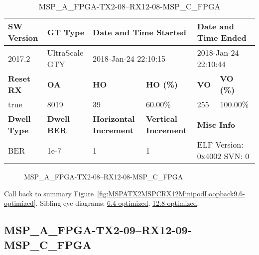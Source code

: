 \begin{table}[h]
\centering
\caption{MSP\_A\_FPGA-TX2-08--RX12-08-MSP\_C\_FPGA}
\label{tab:MSPAFPGATX208RX1208MSPCFPGA9.6-optimized}
\begin{tabular}{@{}|l|l|l|l|l|l|@{}}
\toprule
\textbf{SW Version}                & \textbf{GT Type}   & \multicolumn{2}{l|}{\textbf{Date and Time Started}}            & \multicolumn{2}{l|}{\textbf{Date and Time Ended}}        \\ \midrule
2017.2                       & UltraScale GTY          & \multicolumn{2}{l|}{2018-Jan-24 22:10:15}                   & \multicolumn{2}{l|}{2018-Jan-24 22:10:44}               \\ \midrule
\textbf{Reset RX}                  & \textbf{OA} & \textbf{HO}   & \textbf{HO (\%)} & \textbf{VO} & \textbf{VO (\%)} \\ \midrule
true & 8019        & 39          & 60.00\%        & 255        & 100.00\%       \\ \midrule
\textbf{Dwell Type}                & \textbf{Dwell BER} & \textbf{Horizontal Increment} & \textbf{Vertical Increment}    & \multicolumn{2}{l|}{\textbf{Misc Info}}                  \\ \midrule
BER                            & 1e-7        & 1        & 1           & \multicolumn{2}{l|}{ELF Version: 0x4002 SVN: 0}                         \\ \bottomrule
\end{tabular}
\end{table}

\begin{figure}[h]
\caption{MSP\_A\_FPGA-TX2-08--RX12-08-MSP\_C\_FPGA} \label{fig:MSPAFPGATX208RX1208MSPCFPGA9.6-optimized}
\end{figure}

Call back to summary Figure~\ref{fig:MSPATX2MSPCRX12MinipodLoopback9.6-optimized}.
Sibling eye diagrams: \hyperref[sec:MSPAFPGATX208RX1208MSPCFPGA6.4-optimized]{6.4-optimized}, \hyperref[sec:MSPAFPGATX208RX1208MSPCFPGA12.8-optimized]{12.8-optimized}.

\clearpage
\newpage


\subsection{MSP\_A\_FPGA-TX2-09--RX12-09-MSP\_C\_FPGA}\label{sec:MSPAFPGATX209RX1209MSPCFPGA9.6-optimized}

